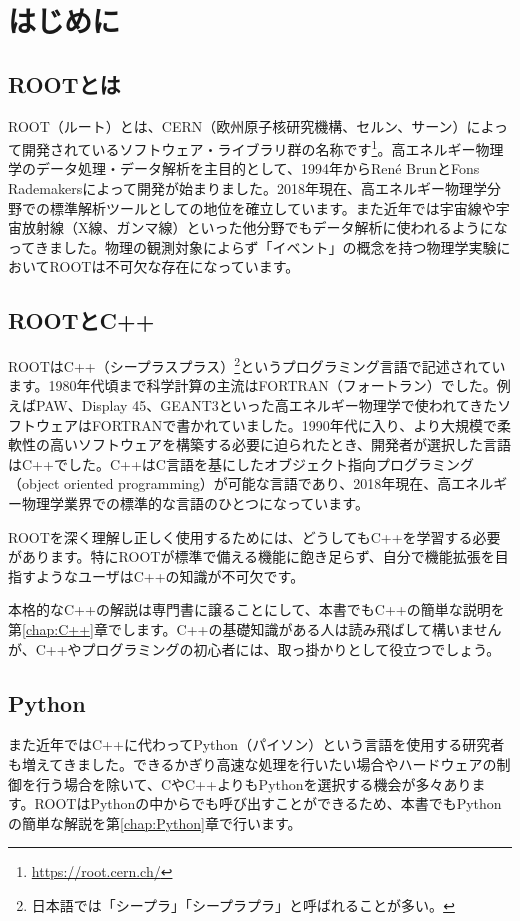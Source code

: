 \chapter{はじめに}

\section{ROOTとは}
ROOT（ルート）とは、CERN（欧州原子核研究機構、セルン、サーン）によって開発されているソフトウェア・ライブラリ群の名称です\footnote{\url{https://root.cern.ch/}}\cite{Brun:1997:ROOT----An-object-oriented-data-analysis}。高エネルギー物理学のデータ処理・データ解析を主目的として、1994年からRen\'e BrunとFons Rademakersによって開発が始まりました。2018年現在、高エネルギー物理学分野での標準解析ツールとしての地位を確立しています。また近年では宇宙線や宇宙放射線（X線、ガンマ線）といった他分野でもデータ解析に使われるようになってきました。物理の観測対象によらず「イベント」の概念を持つ物理学実験においてROOTは不可欠な存在になっています。

\section{ROOTとC++}
ROOTはC++（シープラスプラス）\footnote{日本語では「シープラ」「シープラプラ」と呼ばれることが多い。}というプログラミング言語で記述されています。1980年代頃まで科学計算の主流はFORTRAN（フォートラン）でした。例えばPAW、Display 45、GEANT3といった高エネルギー物理学で使われてきたソフトウェアはFORTRANで書かれていました。1990年代に入り、より大規模で柔軟性の高いソフトウェアを構築する必要に迫られたとき、開発者が選択した言語はC++でした。C++はC言語を基にしたオブジェクト指向プログラミング（object oriented programming）が可能な言語であり、2018年現在、高エネルギー物理学業界での標準的な言語のひとつになっています。

ROOTを深く理解し正しく使用するためには、どうしてもC++を学習する必要があります。特にROOTが標準で備える機能に飽き足らず、自分で機能拡張を目指すようなユーザはC++の知識が不可欠です。

本格的なC++の解説は専門書に譲ることにして、本書でもC++の簡単な説明を第\ref{chap:C++}章でします。C++の基礎知識がある人は読み飛ばして構いませんが、C++やプログラミングの初心者には、取っ掛かりとして役立つでしょう。

\section{Python}
また近年ではC++に代わってPython（パイソン）という言語を使用する研究者も増えてきました。できるかぎり高速な処理を行いたい場合やハードウェアの制御を行う場合を除いて、CやC++よりもPythonを選択する機会が多々あります。ROOTはPythonの中からでも呼び出すことができるため、本書でもPythonの簡単な解説を第\ref{chap:Python}章で行います。

